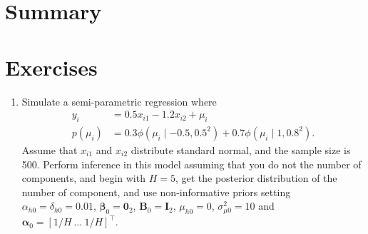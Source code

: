\section{Summary}\label{sec11_3}

\section{Exercises}\label{sec11_4}

\begin{enumerate}
	\item Simulate a semi-parametric regression where
	\begin{align*}
		y_i &= 0.5x_{i1} - 1.2x_{i2} + \mu_i\\
		p(\mu_i) &= 
		0.3 \phi(\mu_i \mid -0.5,0.5^2)+0.7 \phi(\mu_i \mid 1,0.8^2).		
	\end{align*}
Assume that $x_{i1}$ and $x_{i2}$ distribute standard normal, and the sample size is 500. Perform inference in this model assuming that you do not the number of components, and begin with $H=5$, get the posterior distribution of the number of component, and use non-informative priors setting $\alpha_{h0}=\delta_{h0}=0.01$, $\bm{\beta}_0=\bm{0}_2$, $\bm{B}_0=\bm{I}_2$, $\mu_{h0}=0$, $\sigma^2_{\mu 0}=10$ and $\bm{\alpha}_0=[1/H \ \dots \ 1/H]^{\top}$. 
\end{enumerate}


